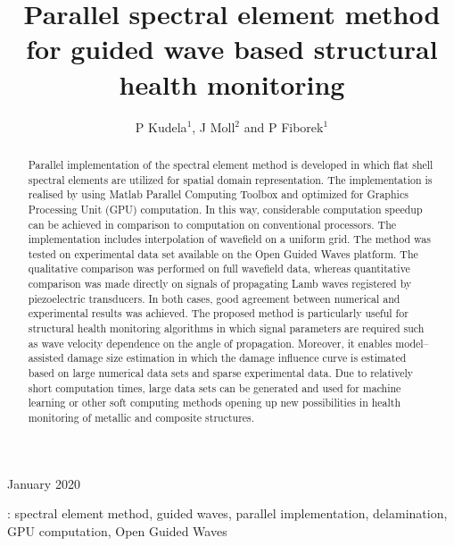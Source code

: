\documentclass[12pt]{iopart}
\begin{document}
\title[Parallel spectral element method for SHM]{Parallel spectral element method for guided wave based structural health monitoring}

\author{P Kudela\(^1\), J Moll\(^2\) and P Fiborek\(^1\)}

\address{\(^1\)Institute of Fluid Flow Machinery, Polish Academy of Sciences, Poland}
\address{\(^2\)J.W. Goethe--University, Department of Physics, 60438 Frankfurt, Germany}

\vspace{10pt}
\begin{indented}
\item[]January 2020
\end{indented}

\begin{abstract}
Parallel implementation of the spectral element method is developed in which flat shell spectral elements are utilized for spatial domain representation. The implementation is realised by using Matlab Parallel Computing Toolbox and optimized for Graphics Processing Unit (GPU) computation. In this way, considerable computation speedup can be achieved in comparison to computation on conventional processors. The implementation includes interpolation of wavefield on a uniform grid. The method was tested on experimental data set available on the Open Guided Waves platform. The qualitative comparison was performed on full wavefield data, whereas quantitative comparison was made directly on signals of propagating Lamb waves registered by piezoelectric transducers. In both cases, good agreement between numerical and experimental results was achieved. The proposed method is particularly useful for structural health monitoring algorithms in which signal parameters are required such as wave velocity dependence on the angle of propagation. Moreover, it enables model--assisted damage size estimation in which the damage influence curve is estimated based on large numerical data sets and sparse experimental data. Due to relatively short computation times, large data sets can be generated and used for machine learning or other soft computing methods opening up new possibilities in health monitoring of metallic and composite structures.
\end{abstract}

%
\vspace{2pc}
: spectral element method, guided waves, parallel implementation, delamination, GPU computation, Open Guided Waves\\
\end{document}
